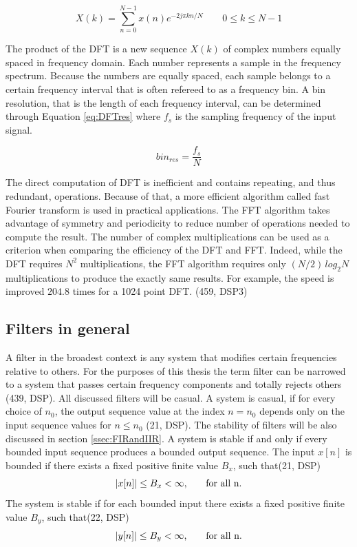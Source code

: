 \begin{equation}
\label{eq:DFT}
	X(k) = \sum\limits_{n=0}^{N - 1}x(n)e^{-2 j \pi k n /N} \qquad 0 \leq k \leq N-1
\end{equation}

The product of the DFT is a new sequence $X(k)$ of complex numbers equally spaced in frequency domain. Each number represents a sample in the frequency spectrum. Because the numbers are equally spaced, each sample belongs to a certain frequency interval that is often refereed to as a frequency bin. A bin resolution, that is the length of each frequency interval, can be determined through Equation \ref{eq:DFTres} where $f_s$ is the sampling frequency of the input signal. 

\begin{equation}
\label{eq:DFTres}
bin_{res} = \frac{f_s}{N}
\end{equation}

The direct computation of DFT is inefficient and contains repeating, and thus redundant, operations. Because of that, a more efficient algorithm called fast Fourier transform is used in practical applications. The FFT algorithm takes advantage of symmetry and periodicity to reduce number of operations needed to compute the result. The number of complex multiplications can be used as a criterion when comparing the efficiency of the DFT and FFT. Indeed, while the DFT requires $N^2$ multiplications, the FFT algorithm requires only $(N/2)\,log_2N$ multiplications to produce the exactly same results. For example, the speed is improved $204.8$ times for a 1024 point DFT. (459, DSP3)

\subsection{Filters in general}
A filter in the broadest context is any system that modifies certain frequencies relative to others. For the purposes of this thesis the term filter can be narrowed to a system that passes certain frequency components and totally rejects others (439, DSP). All discussed filters will be casual. A system is casual, if for every choice of $n_0$, the output sequence value at the index $n = n_0$ depends only on the input sequence values for $n \leq n_0$ (21, DSP). The stability of filters will be also discussed in section \ref{ssec:FIRandIIR}. A system is stable if and only if every bounded input sequence produces a bounded output sequence. The input $x[n]$ is bounded if there exists a fixed positive finite value $B_x$, such that(21, DSP)
\begin{equation}
	|x[n]| \leq B_x < \infty\text{,\qquad for all n.}
\end{equation}
The system is stable if for each bounded input there exists a fixed positive finite value $B_y$, such that(22, DSP)
\begin{equation}
	|y[n]| \leq B_y < \infty\text{,\qquad for all n.}
\end{equation}


